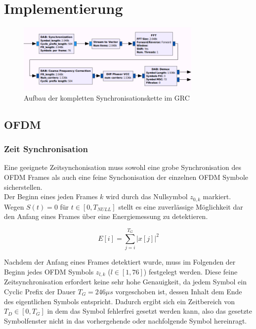 \let\conjugatet\overline
\chapter{Implementierung}
\begin{figure}[h]
\centering
  \includegraphics[width=0.8\textwidth]{figures/sync_hier_block.png}
	\caption{Aufbau der kompletten Synchronisationskette im \ac{GRC}}
	\label{fig:sync_overview}
\end{figure}

\section{OFDM}
\subsection{Zeit Synchronisation}
Eine geeignete Zeitsynchonisation muss sowohl eine grobe Synchronisation des OFDM Frames als auch eine feine Synchonisation der einzelnen OFDM Symbole sicherstellen. \\

Der Beginn eines jeden Frames $ k $ wird durch das Nullsymbol $z_{0,k}$ markiert. Wegen $S(t) = 0$ für $t \in [0, T_{NULL}]$ stellt es eine zuverlässige Möglichkeit dar den Anfang eines Frames über eine Energiemessung zu detektieren.

\begin{equation}
E[i] = \sum \limits_{j=i}^{T_G}|x[j]|^2
\label{eq:energy}
\end{equation}

Nachdem der Anfang eines Frames detektiert wurde, muss im Folgenden der Beginn jedes OFDM Symbols $z_{l,k}$ ($l \in [1, 76]$) festgelegt werden. Diese feine Zeitsynchronisation erfordert keine sehr hohe Genauigkeit, da jedem Symbol ein Cyclic Prefix der Dauer $T_G = 246 \mu s $ vorgeschoben ist, dessen Inhalt dem Ende des eigentlichen Symbols entspricht. Dadurch ergibt sich ein Zeitbereich von  $T_D \in [0,T_G]$ in dem das Symbol fehlerfrei gesetzt werden kann, also das gesetzte Symbolfenster nicht in das vorhergehende oder nachfolgende Symbol hereinragt.

